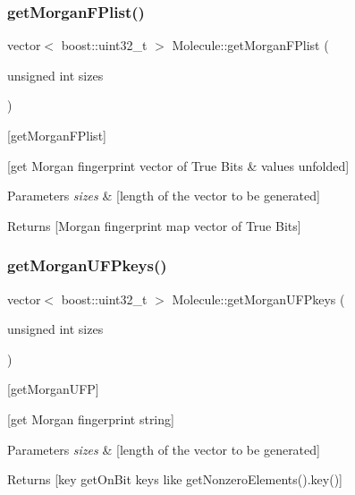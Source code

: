 \subsubsection{\texorpdfstring{get\+Morgan\+F\+Plist()}{getMorganFPlist()}}
{\footnotesize\ttfamily vector$<$ boost\+::uint32\+\_\+t $>$ Molecule\+::get\+Morgan\+F\+Plist (\begin{DoxyParamCaption}\item[{unsigned int}]{sizes }\end{DoxyParamCaption})}



\mbox{[}get\+Morgan\+F\+Plist\mbox{]} 

\mbox{[}get Morgan fingerprint vector of True Bits \& values unfolded\mbox{]}


\begin{DoxyParams}{Parameters}
{\em sizes} & \mbox{[}length of the vector to be generated\mbox{]} \\
\hline
\end{DoxyParams}
\begin{DoxyReturn}{Returns}
\mbox{[}Morgan fingerprint map vector of True Bits\mbox{]} 
\end{DoxyReturn}
\mbox{\label{class_molecule_a51353115cdc974d1cf6b5d99bd9f5300}} 
\subsubsection{\texorpdfstring{get\+Morgan\+U\+F\+Pkeys()}{getMorganUFPkeys()}}
{\footnotesize\ttfamily vector$<$ boost\+::uint32\+\_\+t $>$ Molecule\+::get\+Morgan\+U\+F\+Pkeys (\begin{DoxyParamCaption}\item[{unsigned int}]{sizes }\end{DoxyParamCaption})}



\mbox{[}get\+Morgan\+U\+FP\mbox{]} 

\mbox{[}get Morgan fingerprint string\mbox{]} 
\begin{DoxyParams}{Parameters}
{\em sizes} & \mbox{[}length of the vector to be generated\mbox{]}\\
\hline
\end{DoxyParams}
\begin{DoxyReturn}{Returns}
\mbox{[}key get\+On\+Bit keys like get\+Nonzero\+Elements().key()\mbox{]} 
\end{DoxyReturn}
\mbox{\label{class_molecule_afa532b75ee416a58bf7f628252522e65}} 
